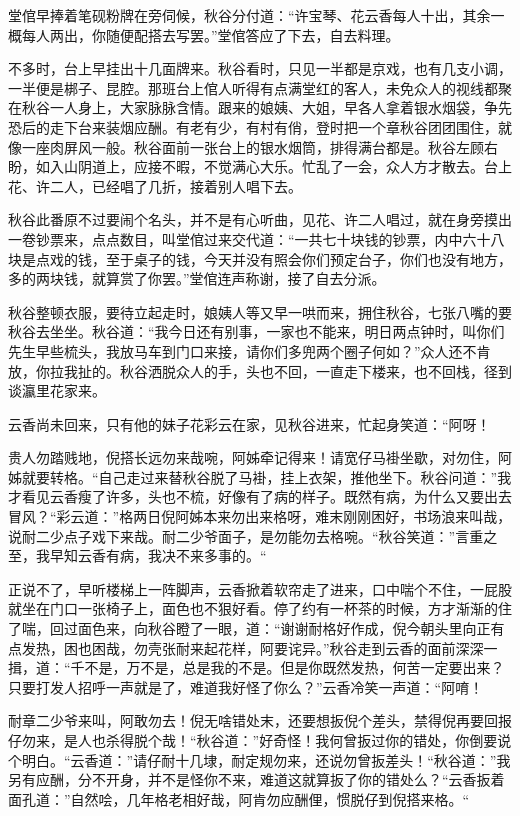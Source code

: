 \documentclass[12pt,UTF8]{ctexbook}
\begin{document}
{{{堂倌早捧着笔砚粉牌在旁伺候，秋谷分付道：“许宝琴、花云香每人十出，其余一概每人两出，你随便配搭去写罢。”堂倌答应了下去，自去料理。

不多时，台上早挂出十几面牌来。秋谷看时，只见一半都是京戏，也有几支小调，一半便是梆子、昆腔。那班台上倌人听得有点满堂红的客人，未免众人的视线都聚在秋谷一人身上，大家脉脉含情。跟来的娘姨、大姐，早各人拿着银水烟袋，争先恐后的走下台来装烟应酬。有老有少，有村有俏，登时把一个章秋谷团团围住，就像一座肉屏风一般。秋谷面前一张台上的银水烟筒，排得满台都是。秋谷左顾右盼，如入山阴道上，应接不暇，不觉满心大乐。忙乱了一会，众人方才散去。台上花、许二人，已经唱了几折，接着别人唱下去。

秋谷此番原不过要闹个名头，并不是有心听曲，见花、许二人唱过，就在身旁摸出一卷钞票来，点点数目，叫堂倌过来交代道：“一共七十块钱的钞票，内中六十八块是点戏的钱，至于桌子的钱，今天并没有照会你们预定台子，你们也没有地方，多的两块钱，就算赏了你罢。”堂倌连声称谢，接了自去分派。

秋谷整顿衣服，要待立起走时，娘姨人等又早一哄而来，拥住秋谷，七张八嘴的要秋谷去坐坐。秋谷道：“我今日还有别事，一家也不能来，明日两点钟时，叫你们先生早些梳头，我放马车到门口来接，请你们多兜两个圈子何如？”众人还不肯放，你拉我扯的。秋谷洒脱众人的手，头也不回，一直走下楼来，也不回栈，径到谈瀛里花家来。

云香尚未回来，只有他的妹子花彩云在家，见秋谷进来，忙起身笑道：“阿呀！

贵人勿踏贱地，倪搭长远勿来哉啘，阿姊牵记得来！请宽仔马褂坐歇，对勿住，阿姊就要转格。“自己走过来替秋谷脱了马褂，挂上衣架，推他坐下。秋谷问道：”我才看见云香瘦了许多，头也不梳，好像有了病的样子。既然有病，为什么又要出去冒风？“彩云道：”格两日倪阿姊本来勿出来格呀，难末刚刚困好，书场浪来叫哉，说耐二少点子戏下来哉。耐二少爷面子，是勿能勿去格啘。“秋谷笑道：”言重之至，我早知云香有病，我决不来多事的。“

正说不了，早听楼梯上一阵脚声，云香掀着软帘走了进来，口中喘个不住，一屁股就坐在门口一张椅子上，面色也不狠好看。停了约有一杯茶的时候，方才渐渐的住了喘，回过面色来，向秋谷瞪了一眼，道：“谢谢耐格好作成，倪今朝头里向正有点发热，困也困哉，勿壳张耐来起花样，阿要诧异。”秋谷走到云香的面前深深一揖，道：“千不是，万不是，总是我的不是。但是你既然发热，何苦一定要出来？只要打发人招呼一声就是了，难道我好怪了你么？”云香冷笑一声道：“阿唷！

耐章二少爷来叫，阿敢勿去！倪无啥错处末，还要想扳倪个差头，禁得倪再要回报仔勿来，是人也杀得脱个哉！“秋谷道：”好奇怪！我何曾扳过你的错处，你倒要说个明白。“云香道：”请仔耐十几埭，耐定规勿来，还说勿曾扳差头！“秋谷道：”我另有应酬，分不开身，并不是怪你不来，难道这就算扳了你的错处么？“云香扳着面孔道：”自然哙，几年格老相好哉，阿肯勿应酬俚，惯脱仔到倪搭来格。“

}}}
\end{document}

